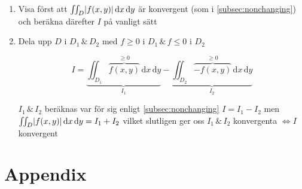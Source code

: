 \documentclass[a4paper]{article}
\newcommand{\de}[1]{\,\mathrm{d}#1}
\DeclarePairedDelimiter \abs{\lvert}{\rvert}
\begin{document}
\begin{enumerate}
\item Visa först att $\iint_D\abs{f(x,y)}\de{x}\de{y}$ är konvergent (som i \vref{subsec:nonchanging}) och beräkna därefter $I$ på vanligt sätt

\item Dela upp $D$ i $D_1 \,\&\, D_2$ med $f \geq 0$ i $D_1 \,\&\, f\leq 0$ i $D_2$

$$
	I = \underbrace{\iint_{D_1}\overbrace{f(x,y)}^{\geq 0}\de{x}\de{y}}_{I_1} - \underbrace{\iint_{D_2}\overbrace{-f(x,y)}^{\geq 0}\de{x}\de{y}}_{I_2}
$$

$I_1 \,\&\, I_2$ beräknas var för sig enligt \vref{subsec:nonchanging} \newline
$I = I_1 - I_2$ men $\iint_D\abs{f(x,y)}\de{x}\de{y} = I_1 + I_2$ vilket slutligen ger oss \newline
$I_1 \,\&\, I_2$ konvergenta $\iff I$ konvergent

\end{enumerate}







\newpage
\fancyhf{}
\section{Appendix}
\begin{appendix}
	\listoffigures
	\listoftables
\end{appendix}
\end{document}
